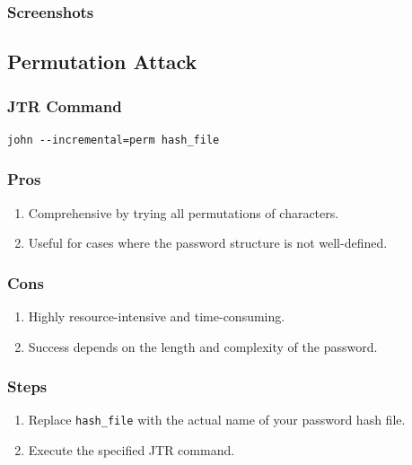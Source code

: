 \documentclass[11pt]{article}
\begin{document}
\subsubsection{Screenshots}

\subsection{Permutation Attack}

\subsubsection{JTR Command}

\begin{verbatim}
john --incremental=perm hash_file
\end{verbatim}

\subsubsection{Pros}

\begin{enumerate}
    \item Comprehensive by trying all permutations of characters.
    \item Useful for cases where the password structure is not well-defined.
\end{enumerate}

\subsubsection{Cons}

\begin{enumerate}
    \item Highly resource-intensive and time-consuming.
    \item Success depends on the length and complexity of the password.
\end{enumerate}

\subsubsection{Steps}

\begin{enumerate}
    \item Replace \texttt{hash\_file} with the actual name of your password hash file.
    \item Execute the specified JTR command.
\end{enumerate}
\end{document}
